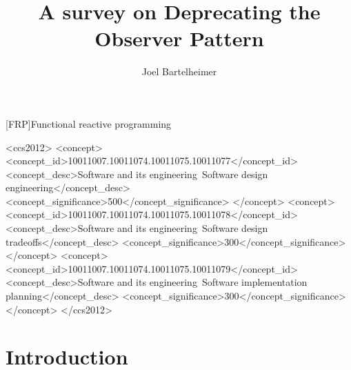 \documentclass[acmsmall]{acmart}\settopmatter{printfolios=true,printccs=false,printacmref=false}
\begin{document}
[FRP]{Functional reactive programming}

\title{A survey on Deprecating the Observer Pattern}

\author{Joel Bartelheimer}


\renewcommand\shortauthors{Bartelheimer, J. }

\begin{abstract}
	\blindtext
\end{abstract}


%
%
\begin{CCSXML}
	<ccs2012>
	<concept>
	<concept_id>10011007.10011074.10011075.10011077</concept_id>
	<concept_desc>Software and its engineering~Software design engineering</concept_desc>
	<concept_significance>500</concept_significance>
	</concept>
	<concept>
	<concept_id>10011007.10011074.10011075.10011078</concept_id>
	<concept_desc>Software and its engineering~Software design tradeoffs</concept_desc>
	<concept_significance>300</concept_significance>
	</concept>
	<concept>
	<concept_id>10011007.10011074.10011075.10011079</concept_id>
	<concept_desc>Software and its engineering~Software implementation planning</concept_desc>
	<concept_significance>300</concept_significance>
	</concept>
	</ccs2012>
\end{CCSXML}

%
%
\maketitle


\section{Introduction}
	
\end{document}
